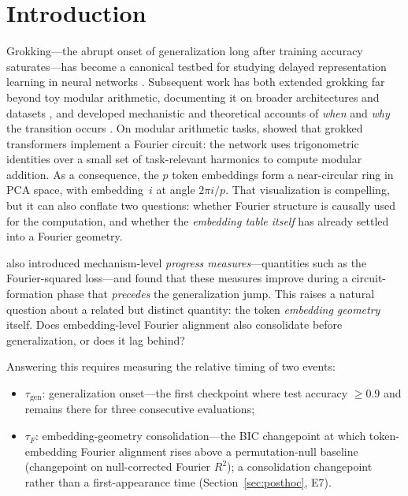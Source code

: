 \documentclass{article}
\newcommand{\taug}{\tau_{\mathrm{gen}}}
\newcommand{\tauf}{\tau_{F}}
\begin{document}
\section{Introduction}
\label{sec:intro}

Grokking---the abrupt onset of generalization long after training
accuracy saturates---has become a canonical testbed for studying
delayed representation learning in neural networks
\citep{power2022grokking}.
Subsequent work has both extended grokking far beyond toy modular
arithmetic, documenting it on broader architectures and datasets
\citep{liu2023omnigrok,humayun2024deep,miller2024grokking}, and
developed mechanistic and theoretical accounts of \emph{when} and
\emph{why} the transition occurs
\citep{nanda2023progress,varma2023explaining,lyu2024dichotomy,
       rubin2024grokking,kumar2024lazy,mohamadi2024grok}.
On modular arithmetic tasks, \citet{nanda2023progress} showed that
grokked transformers implement a Fourier circuit: the network uses
trigonometric identities over a small set of task-relevant harmonics
to compute modular addition.
As a consequence, the $p$ token embeddings form a near-circular ring
in PCA space, with embedding~$i$ at angle $2\pi i/p$.
That visualization is compelling, but it can also conflate two
questions: whether Fourier structure is causally used for the
computation, and whether the \emph{embedding table itself} has
already settled into a Fourier geometry.

\citet{nanda2023progress} also introduced mechanism-level
\emph{progress measures}---quantities such as the Fourier-squared
loss---and found that these measures improve during a circuit-formation
phase that \emph{precedes} the generalization jump.
This raises a natural question about a related but distinct quantity:
the token \emph{embedding geometry} itself.
Does embedding-level Fourier alignment also consolidate before
generalization, or does it lag behind?

Answering this requires measuring the relative timing of two events:
\begin{itemize}
  \item $\taug$: generalization onset---the first checkpoint where
    test accuracy $\geq 0.9$ and remains there for three consecutive
    evaluations;
  \item $\tauf$: embedding-geometry consolidation---the BIC
    changepoint at which token-embedding Fourier alignment rises
    above a permutation-null baseline (changepoint on
    null-corrected Fourier $R^2$); a consolidation changepoint
    rather than a first-appearance time
    (Section~\ref{sec:posthoc}, E7).
\end{itemize}
\end{document}
